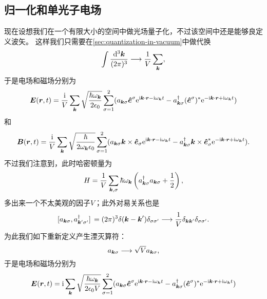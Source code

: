 \subsection{归一化和单光子电场}

现在设想我们在一个有限大小的空间中做光场量子化，不过该空间中还是能够良定义波矢。
这样我们只需要在\autoref{sec:quantization-in-vacuum}中做代换
\[
    \int \frac{\dd[3]{\vb*{k}}}{(2\pi)^3} \longrightarrow \frac{1}{V} \sum_{\vb*{k}},
\]
于是电场和磁场分别为
\begin{equation}
    \vb*{E}(\vb*{r}, t) = \frac{\mathrm{i}}{V} \sum_{\vb*{k}} \sqrt{\frac{\hbar \omega_{\vb*{k}}}{2 \epsilon_0}} \sum_{\sigma=1}^2 (a_{\vb*{k} \sigma} \vu*{e}^\sigma \mathrm{e}^{\mathrm{i} \vb*{k} \cdot \vb*{r} - \mathrm{i} \omega_{\vb*{k}} t} - a^\dagger_{\vb*{k} \sigma} (\vu*{e}^\sigma)^* \mathrm{e}^{- \mathrm{i} \vb*{k} \cdot \vb*{r} + \mathrm{i} \omega_{\vb*{k}} t})
    \label{eq:vacuum-e-field-cavity-origin}
\end{equation}
和
\begin{equation}
    \vb*{B}(\vb*{r}, t) = \frac{\mathrm{i}}{V} \sum_{\vb*{k}} \sqrt{\frac{\hbar}{2 \omega_{\vb*{k}} \epsilon_0}} \sum_{\sigma=1}^2 (a_{\vb*{k} \sigma} \vb*{k} \times \vu*{e}_\sigma \mathrm{e}^{\mathrm{i} \vb*{k} \cdot \vb*{r} - \mathrm{i} \omega_{\vb*{k}} t} - a^\dagger_{\vb*{k} \sigma} \vb*{k} \times \vu*{e}_\sigma^* \mathrm{e}^{- \mathrm{i} \vb*{k} \cdot \vb*{r} + \mathrm{i} \omega_{\vb*{k}} t}).
    \label{eq:vacuum-b-field-cavity-origin}
\end{equation}
不过我们注意到，此时哈密顿量为
\[
    H = \frac{1}{V} \sum_{\vb*{k}, \sigma} \hbar \omega_{\vb*{k}} \left( a^\dagger_{\vb*{k} \sigma} a_{\vb*{k} \sigma} + \frac{1}{2} \right),
\]
多出来一个不太美观的因子$V$；此外对易关系也是
\[
    \comm*{a_{\vb*{k} \sigma}}{a_{\vb*{k}' \sigma'}^\dagger} = (2\pi)^3 \delta(\vb*{k} - \vb*{k}') \delta_{\sigma \sigma'} \longrightarrow \frac{1}{V} \delta_{\vb*{k} \vb*{k}'} \delta_{\sigma \sigma'}.
\]
为此我们如下重新定义产生湮灭算符：
\begin{equation}
    a_{\vb*{k} \sigma} \longrightarrow \sqrt{V} a_{\vb*{k} \sigma},
\end{equation}
于是电场和磁场分别为
\begin{equation}
    \vb*{E}(\vb*{r}, t) = \mathrm{i} \sum_{\vb*{k}} \sqrt{\frac{\hbar \omega_{\vb*{k}}}{2 \epsilon_0 V}} \sum_{\sigma=1}^2 (a_{\vb*{k} \sigma} \vu*{e}^\sigma \mathrm{e}^{\mathrm{i} \vb*{k} \cdot \vb*{r} - \mathrm{i} \omega_{\vb*{k}} t} - a^\dagger_{\vb*{k} \sigma} (\vu*{e}^\sigma)^* \mathrm{e}^{- \mathrm{i} \vb*{k} \cdot \vb*{r} + \mathrm{i} \omega_{\vb*{k}} t})
    \label{eq:vacuum-e-field-cavity-1}
\end{equation}
